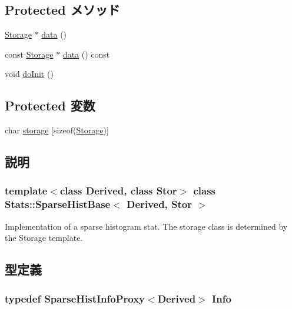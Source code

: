 \subsection*{Protected メソッド}
\begin{DoxyCompactItemize}
\item 
\hyperlink{classStats_1_1SparseHistBase_a5d4a6db0e7c32292f54a08d05c671bd1}{Storage} $\ast$ \hyperlink{classStats_1_1SparseHistBase_a6616795ceb2f25c33a3c2d6c0a387514}{data} ()
\item 
const \hyperlink{classStats_1_1SparseHistBase_a5d4a6db0e7c32292f54a08d05c671bd1}{Storage} $\ast$ \hyperlink{classStats_1_1SparseHistBase_aabedc9303ac5bae8af18ceaeeb7fe44b}{data} () const 
\item 
void \hyperlink{classStats_1_1SparseHistBase_acbb3b2ff6c84b7ae0dcc576f85bee3b5}{doInit} ()
\end{DoxyCompactItemize}
\subsection*{Protected 変数}
\begin{DoxyCompactItemize}
\item 
char \hyperlink{classStats_1_1SparseHistBase_ac200e6848cd31cfaedd12f91a90b7ac2}{storage} \mbox{[}sizeof(\hyperlink{classStats_1_1SparseHistBase_a5d4a6db0e7c32292f54a08d05c671bd1}{Storage})\mbox{]}
\end{DoxyCompactItemize}


\subsection{説明}
\subsubsection*{template$<$class Derived, class Stor$>$ class Stats::SparseHistBase$<$ Derived, Stor $>$}

Implementation of a sparse histogram stat. The storage class is determined by the Storage template. 

\subsection{型定義}
\hypertarget{classStats_1_1SparseHistBase_a0af9f4fe80bc5e1ee0b1d79bd353c504}{
\subsubsection[{Info}]{\setlength{\rightskip}{0pt plus 5cm}typedef {\bf SparseHistInfoProxy}$<$Derived$>$ {\bf Info}}}
\label{classStats_1_1SparseHistBase_a0af9f4fe80bc5e1ee0b1d79bd353c504}


